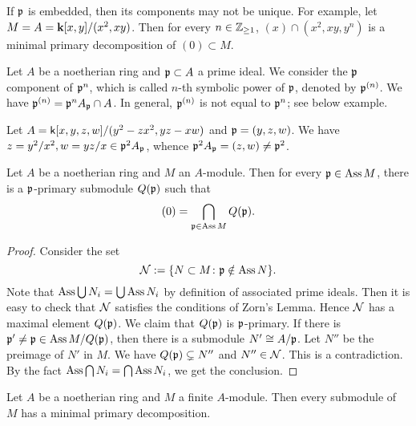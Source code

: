     \begin{example}
        If ${\mathfrak{p}}$ is embedded, then its components may not be unique.
        For example, let $M = A = {\mathbf{k}}[x,y]/(x^2,xy)$.
        Then for every $n \in {\mathbb{Z}}_{\geq 1}$, $(x) \cap (x^2,xy,y^n)$ is a minimal primary decomposition of $(0) \subset M$.
    \end{example}

    Let $A$ be a noetherian ring and ${\mathfrak{p}} \subset A$ a prime ideal.
    We consider the ${\mathfrak{p}}$ component of ${\mathfrak{p}}^n$, which is called $n$-th symbolic power of ${\mathfrak{p}}$, denoted by ${\mathfrak{p}}^{(n)}$.
    We have ${\mathfrak{p}}^{(n)} = {\mathfrak{p}}^nA_{\mathfrak{p}} \cap A$.
    In general, ${\mathfrak{p}}^{(n)}$ is not equal to ${\mathfrak{p}}^n$; see below example.

    \begin{example}
        Let $A = {\mathsf{k}}[x,y,z,w]/(y^2-zx^2,yz-xw)$ and ${\mathfrak{p}} = (y,z,w)$.
        We have $z = y^2/x^2,w = yz/x \in {\mathfrak{p}}^2 A_{\mathfrak{p}}$, whence ${\mathfrak{p}}^2 A_{\mathfrak{p}} = (z,w) \neq {\mathfrak{p}}^2$.
    \end{example}
    
    \begin{theorem}\label{thm: primary decomposition for general module}
        Let $A$ be a noetherian ring and $M$ an $A$-module.
        Then for every ${\mathfrak{p}} \in \operatorname{Ass} M$, there is a ${\mathfrak{p}}$-primary submodule $Q({\mathfrak{p}})$ such that 
        \[ (0) = \bigcap_{{\mathfrak{p}} \in \operatorname{Ass} M} Q({\mathfrak{p}}). \] 
    \end{theorem}
    \begin{proof}
        Consider the set 
        \[ {\mathcal{N}}:= \{N \subset M \colon {\mathfrak{p}} \notin \operatorname{Ass} N \}. \]
        Note that $\operatorname{Ass} \bigcup N_i = \bigcup \operatorname{Ass} N_i$ by definition of associated prime ideals.
        Then it is easy to check that ${\mathcal{N}}$ satisfies the conditions of Zorn's Lemma.
        Hence ${\mathcal{N}}$ has a maximal element $Q({\mathfrak{p}})$.
        We claim that $Q({\mathfrak{p}})$ is ${\mathfrak{p}}$-primary.
        If there is ${\mathfrak{p}}' \neq {\mathfrak{p}} \in \operatorname{Ass} M/Q({\mathfrak{p}})$, then there is a submodule $N' \cong A/{\mathfrak{p}}$.
        Let $N''$ be the preimage of $N'$ in $M$.
        We have $Q({\mathfrak{p}}) \subsetneq N''$ and $N'' \in {\mathcal{N}}$.
        This is a contradiction.
        By the fact $\operatorname{Ass} \bigcap N_i = \bigcap \operatorname{Ass} N_i$, we get the conclusion.
    \end{proof}

    \begin{corollary}\label{cor: primary decomposition for finitely generated module}
        Let $A$ be a noetherian ring and $M$ a finite $A$-module.
        Then every submodule of $M$ has a minimal primary decomposition.
    \end{corollary}

